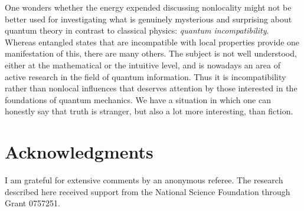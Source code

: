 \documentclass[10pt]{article} %
\begin{document}
One wonders whether the energy expended discussing nonlocality might not be
better used for investigating what is genuinely mysterious and surprising
about quantum theory in contrast to classical physics: \emph{quantum
  incompatibility}.  Whereas entangled states that are incompatible with local
properties provide one manifestation of this, there are many others. The
subject is not well understood, either at the mathematical or the intuitive
level, and is nowadays an area of active research in the field of quantum
information.  Thus it is incompatibility rather than nonlocal influences that
deserves attention by those interested in the foundations of quantum
mechanics.  We have a situation in which one can honestly say that truth is
stranger, but also a lot more interesting, than fiction.

\section*{Acknowledgments}
I am grateful for extensive comments by an anonymous referee. The research
described here received support from the National Science Foundation through
Grant 0757251.


\xb



\end{document}
